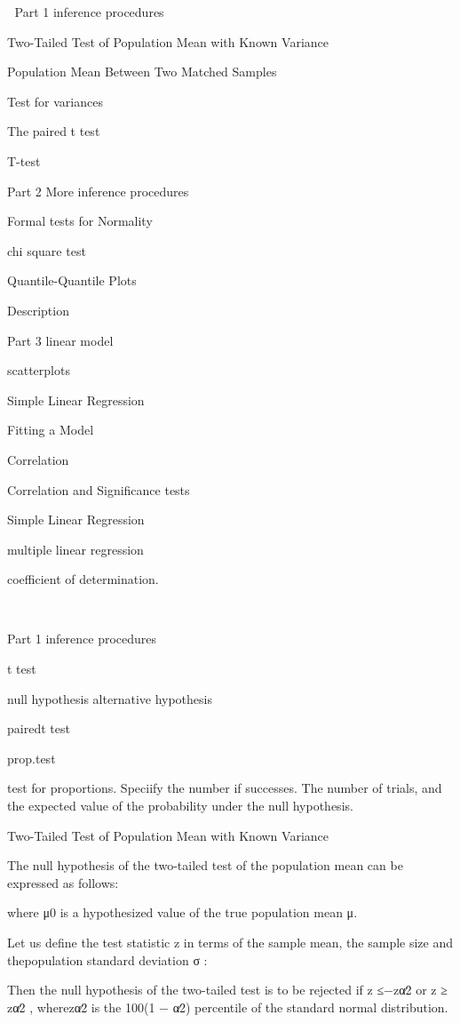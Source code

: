 

Part 1 inference procedures

Two-Tailed Test of Population Mean with Known Variance

Population Mean Between Two Matched Samples

Test for variances

The paired t test

T-test

Part 2 More inference procedures

Formal tests for Normality

chi square test

Quantile-Quantile Plots

Description

Part 3 linear model

scatterplots

Simple Linear Regression

Fitting a Model

Correlation

Correlation and Significance tests

Simple Linear Regression

multiple linear regression

coefficient of determination.




Part 1 inference procedures

t test

null hypothesis alternative hypothesis

pairedt test 

prop.test


test for proportions. Speciify the number if successes.  The number of trials, and the expected value of the probability under the null hypothesis.


Two-Tailed Test of Population Mean with Known Variance

The null hypothesis of the two-tailed test of the population mean can be expressed as follows:



where μ0 is a hypothesized value of the true population mean μ.

Let us define the test statistic z in terms of the sample mean, the sample size and thepopulation standard deviation σ :



Then the null hypothesis of the two-tailed test is to be rejected if z ≤−zα∕2 or z ≥ zα∕2 , wherezα∕2 is the 100(1 − α∕2) percentile of the standard normal distribution.

